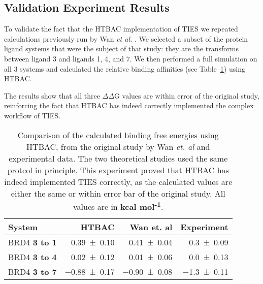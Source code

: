 

\subsection{Validation Experiment Results}

To validate the fact that the HTBAC implementation of TIES we 
repeated calculations previously run by Wan \textit{et al.}
\cite{Wan2017brd4}. We selected a subset of the protein ligand systems that
were the subject of that study: they are the transforms between ligand 3 and ligands 1, 4,
and 7. We then performed a full simulation on all 3 systems and calculated the
relative binding affinities (see Table~\ref{tab:exp2}) using HTBAC.

The results show that all three $\Delta \Delta$G values are within error 
of the original study, reinforcing the fact that HTBAC has indeed correctly
implemented the complex workflow of TIES.

\begin{table}
  \centering
  \begin{tabular}{l@{\hskip 1in}r@{\hskip 0.2in}r@{\hskip 0.2in}r}
    \toprule
    System & HTBAC & Wan et. al & Experiment \\
    \midrule
    BRD4 \textbf{3 to 1} & \num{0.39 +- 0.10} &   \num{0.41 +- 0.04} &  \num{0.3 +- 0.09} \\
    BRD4 \textbf{3 to 4} & \num{0.02 +- 0.12} &   \num{0.01 +- 0.06} &  \num{0.0 +- 0.13} \\
    BRD4 \textbf{3 to 7} & \num{-0.88 +- 0.17} &  \num{-0.90 +- 0.08} & \num{-1.3 +- 0.11} \\
    \bottomrule
  \end{tabular}

  \caption{Comparison of the calculated binding free energies using HTBAC, from
  the original study by Wan \textit{et. al} and experimental data. The two theoretical
  studies used the same protcol in principle. This experiment proved that HTBAC
  has indeed implemented TIES correctly, as the calculated values are either
  the same or within error bar of the original study. All values are in
  \textbf{kcal mol\textsuperscript{-1}}.}
  \label{tab:exp2}


\end{table}


